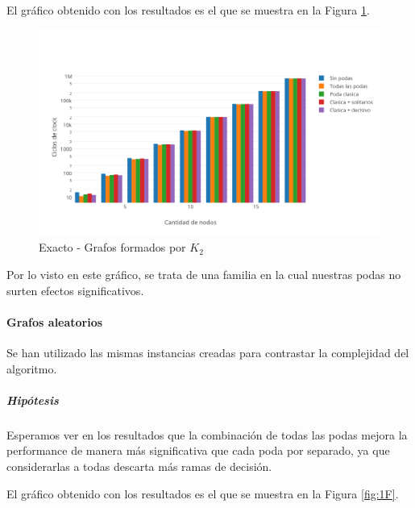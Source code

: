 \vspace*{0.3cm}

El gráfico obtenido con los resultados es el que se muestra en la Figura \ref{fig:1E}.

\begin{figure}[htb]
	\begin{center}
    		\includegraphics[scale=0.8]{imagenes/exacto-k2.png}
	\end{center}
	\caption{Exacto - Grafos formados por $K_2$}\label{fig:1E}
\end{figure}

Por lo visto en este gráfico, se trata de una familia en la cual nuestras podas no surten efectos significativos.

\paragraph{Grafos aleatorios}

Se han utilizado las mismas instancias creadas para contrastar la complejidad del algoritmo.

\subparagraph{Hipótesis} Esperamos ver en los resultados que la combinación de todas las podas mejora la performance de manera más significativa que cada poda por separado, ya que considerarlas a todas descarta más ramas de decisión.

\vspace*{0.3cm}

El gráfico obtenido con los resultados es el que se muestra en la Figura \ref{fig:1F}.

